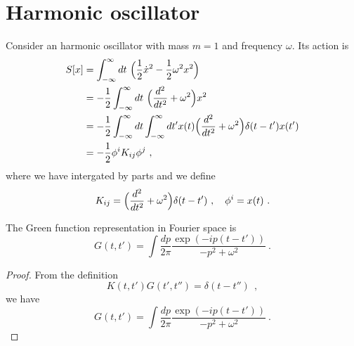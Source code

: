 \chapter{Harmonic oscillator}

    Consider an harmonic oscillator with mass $m=1$ and frequency $\omega$. Its action is 
    \begin{equation*}
    \begin{aligned}
        S[x] & = \int_{-\infty}^\infty dt ~ \Big ( \frac{1}{2} \dot x^2 - \frac{1}{2} \omega^2 x^2 \Big) \\ & = - \frac{1}{2} \int_{-\infty}^\infty dt ~ \Big (\frac{d^2}{dt^2} + \omega^2 \Big) x^2 \\ & = - \frac{1}{2} \int_{-\infty}^\infty dt \int_{-\infty}^\infty dt' x(t) \Big (\frac{d^2}{dt^2} + \omega^2 \Big) \delta (t - t') x(t') \\ & = - \frac{1}{2} \phi^i K_{ij} \phi^j ~,
    \end{aligned}
    \end{equation*}
    where we have intergated by parts and we define 
    \begin{equation*}
        K_{ij} = \Big (\frac{d^2}{dt^2} + \omega^2 \Big) \delta (t - t') ~, \quad \phi^i = x(t) ~.
    \end{equation*}

    The Green function representation in Fourier space is 
    \begin{equation*}
        G(t, t') = \int \frac{dp}{2\pi} \frac{\exp(- i p (t - t'))}{-p^2 + \omega^2} ~.
    \end{equation*}
    \begin{proof}
        From the definition 
        \begin{equation*}
            K(t, t') G(t', t'') = \delta (t - t'') ~ ~,
        \end{equation*}
        we have 
        \begin{equation*}
            G(t, t') = \int \frac{dp}{2\pi} \frac{\exp(- i p (t - t'))}{-p^2 + \omega^2} ~.
        \end{equation*}
    \end{proof}

